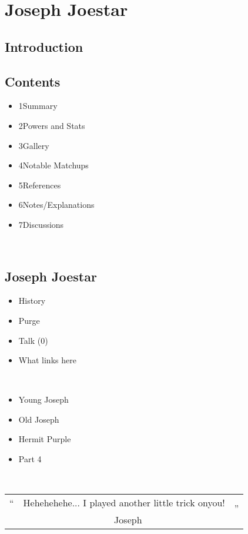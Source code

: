 \documentclass[a4paper,12pt]{article}
\begin{document}
\section*{ Joseph Joestar}

\subsection*{Introduction}\n\n\subsection*{Contents}\n\n\begin{itemize}
\item 1Summary
\item 2Powers and Stats
\item 3Gallery
\item 4Notable Matchups
\item 5References
\item 6Notes/Explanations
\item 7Discussions
\end{itemize}\\ \par \vspace{0.5cm}

\subsection*{Joseph Joestar}\n\n\begin{itemize}
\item History
\item Purge
\item Talk (0)
\item What links here
\end{itemize}\\ \par \vspace{0.5cm}

\begin{itemize}
\item Young Joseph
\item Old Joseph
\item Hermit Purple
\item Part 4
\end{itemize}\\ \par \vspace{0.5cm}

\begin{tabular}{|c|c|c|} \hline
“ & Hehehehehe... I played another little trick onyou! & „ \\
 & ~ Joseph &  \\
\end{tabular}\\ \par \vspace{0.5cm}
\end{document}

